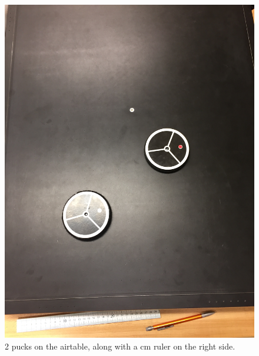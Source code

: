 \documentclass[11pt]{article}
\begin{document}
\begin{figure}[!h]
     \includegraphics{pucks.JPG}
     \caption{2 pucks on the airtable, along with a cm ruler on the right side.}
     \label{pucks}
\end{figure}
\end{document}
